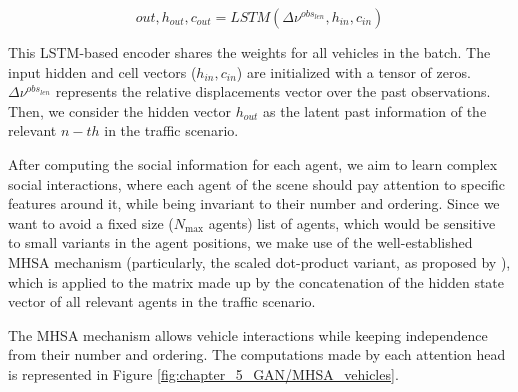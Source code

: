 \begin{equation}
	out, h_{out}, c_{out} = LSTM(\Delta \nu^{obs_{len}}, h_{in}, c_{in})
\end{equation}

This \ac{LSTM}-based encoder shares the weights for all vehicles in the batch. The input hidden and cell vectors ($h_{in}, c_{in}$) are initialized with a tensor of zeros. $\Delta \nu^{obs_{len}}$ represents the relative displacements vector over the past observations. Then, we consider the hidden vector $h_{out}$ as the latent past information of the relevant $n-th$ in the traffic scenario.

After computing the social information for each agent, we aim to learn complex social interactions, where each agent of the scene should pay attention to specific features around it, while being invariant to their number and ordering. Since we want to avoid a fixed size ($N_{\text{max}}$ agents) list of agents, which would be sensitive to small variants in the agent positions, we make use of the well-established \acf{MHSA} mechanism \cite{vaswani2017attention} (particularly, the scaled dot-product variant, as proposed by \cite{mercat2020multi}), which is applied to the matrix made up by the concatenation of the hidden state vector of all relevant agents in the traffic scenario.

The \ac{MHSA} mechanism allows vehicle interactions while keeping independence from their number
and ordering. The computations made by each attention head is represented in Figure \ref{fig:chapter_5_GAN/MHSA_vehicles}.

